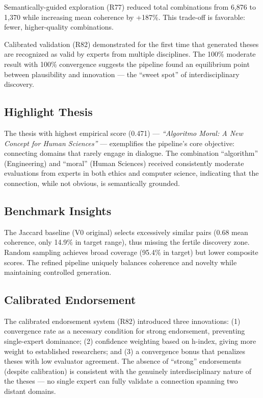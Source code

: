 \documentclass[a4paper,12pt]{article}
\begin{document}
Semantically-guided exploration (R77) reduced total combinations from 6,876 to 1,370 
while increasing mean coherence by +187\%. This trade-off is favorable: fewer, 
higher-quality combinations.

Calibrated validation (R82) demonstrated for the first time that generated theses 
are recognized as valid by experts from multiple disciplines. The 100\% moderate 
result with 100\% convergence suggests the pipeline found an equilibrium point 
between plausibility and innovation --- the ``sweet spot'' of interdisciplinary 
discovery.

\subsection{Highlight Thesis}

The thesis with highest empirical score (0.471) --- \textit{``Algoritmo Moral: A New 
Concept for Human Sciences''} --- exemplifies the pipeline's core objective: connecting 
domains that rarely engage in dialogue. The combination ``algorithm'' (Engineering) and 
``moral'' (Human Sciences) received consistently moderate evaluations from experts in 
both ethics and computer science, indicating that the connection, while not obvious, 
is semantically grounded.

\subsection{Benchmark Insights}

The Jaccard baseline (V0 original) selects excessively similar pairs (0.68 mean 
coherence, only 14.9\% in target range), thus missing the fertile discovery zone. 
Random sampling achieves broad coverage (95.4\% in target) but lower composite scores. 
The refined pipeline uniquely balances coherence and novelty while maintaining 
controlled generation.

\subsection{Calibrated Endorsement}

The calibrated endorsement system (R82) introduced three innovations: (1) convergence 
rate as a necessary condition for strong endorsement, preventing single-expert dominance; 
(2) confidence weighting based on h-index, giving more weight to established researchers; 
and (3) a convergence bonus that penalizes theses with low evaluator agreement. 
The absence of ``strong'' endorsements (despite calibration) is consistent with the 
genuinely interdisciplinary nature of the theses --- no single expert can fully validate 
a connection spanning two distant domains.
\end{document}

